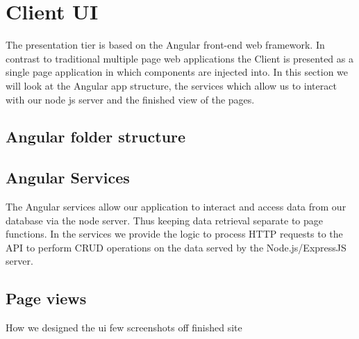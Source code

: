 \section{Client UI}
The presentation tier is based on the Angular front-end web framework. In contrast to traditional multiple page web applications the Client is presented as a single page application in which components are injected into. In this section we will look at the Angular app structure, the services which allow us to interact with our node js server and the finished view of the pages.

\subsection{Angular folder structure}

\subsection{Angular Services}
The Angular services allow our application to interact and access data from our database via the node server. Thus keeping data retrieval separate to page functions. In the services we provide the logic to process HTTP requests to the API to perform CRUD operations on the data served by the Node.js/ExpressJS server. 

\subsection{Page views}

How we designed the ui
few screenshots off finished site
